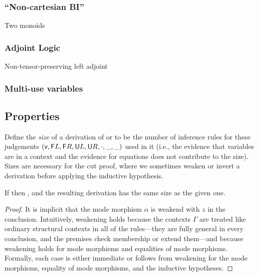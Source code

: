 \subsubsection{``Non-cartesian BI''} Two monoids

\subsubsection{Adjoint Logic} Non-tensor-preserving left adjoint

\subsubsection{Multi-use variables}

\subsection{Properties}

Define the \emph{size} of a derivation of  or
\seq{\Gamma}{\gamma}{\Delta} to be the number of inference rules for
these judgements $(\mathsf{v},\mathsf{F} L, \mathsf{F} R, \mathsf{U} L, \mathsf{U} R,
\cdot, \_,\_)$ used in it (i.e., the evidence that variables are in a
context and the evidence for equations does not contribute to the size).
Sizes are necessary for the cut proof, where we sometimes weaken or
invert a derivation before applying the inductive hypothesis.

\begin{theorem} \label{thm:weakening}
If  then
, and the resulting
derivation has the same size as the given one.  
\end{theorem}
\begin{proof}
It is implicit that the mode morphism $\alpha$ is weakend with $z$ in
the conclusion.  Intuitively, weakening holds because the contexts
$\Gamma$ are treated like ordinary structural contexts in all of the
rules---they are fully general in every conclusion, and the premises
check membership or extend them---and because weakening holds for mode
morphisms and equalities of mode morphisms.  Formally, each case is
either immediate or follows from weakening for the mode morphisms,
equality of mode morphisms, and the inductive hypotheses.
\end{proof}

